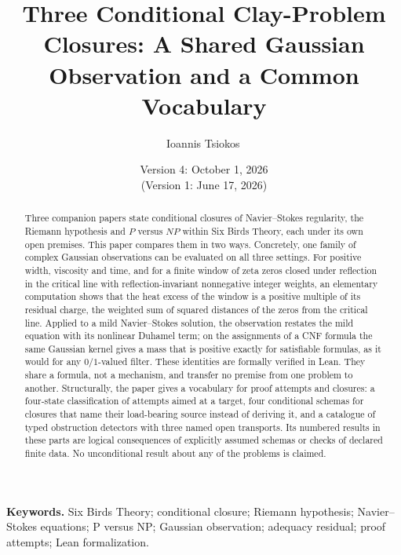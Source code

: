 \documentclass[11pt]{article}
\title{Three Conditional Clay-Problem Closures: A Shared Gaussian Observation and a Common Vocabulary}
\author{Ioannis Tsiokos\,\orcidlink{0009-0009-7659-5964}}
\date{Version 4: October 1, 2026\\[2pt] \footnotesize (Version 1: June 17, 2026)}
\theoremstyle{definition}
\begin{document}
\maketitle
\thispagestyle{firstpage}

\begin{abstract}
Three companion papers state conditional closures of Navier--Stokes
regularity, the Riemann hypothesis and \(P\) versus \(NP\) within Six
Birds Theory, each under its own open premises.  This paper compares
them in two ways.  Concretely, one family of complex Gaussian
observations can be evaluated on all three settings.  For positive
width, viscosity and time, and for a finite window of zeta zeros closed
under reflection in the critical line with reflection-invariant
nonnegative integer weights, an elementary computation shows that the heat excess of the
window is a positive multiple of its residual charge, the weighted sum
of squared distances of the zeros from the critical line.  Applied to a
mild Navier--Stokes solution, the observation restates the mild
equation with its nonlinear Duhamel term; on the assignments of a CNF
formula the same Gaussian kernel gives a mass that is positive exactly
for satisfiable formulas, as it would for any \(0/1\)-valued filter.  These identities are formally verified in
Lean.  They share a formula, not a mechanism, and transfer no premise
from one problem to another.  Structurally, the paper gives a
vocabulary for proof attempts and closures: a four-state classification
of attempts aimed at a target, four conditional schemas for closures
that name their load-bearing source instead of deriving it, and a
catalogue of typed obstruction detectors with three named open
transports.  Its numbered results in these parts are logical
consequences of explicitly assumed schemas or checks of declared finite
data.  No unconditional result about any of the problems is claimed.
\end{abstract}

\medskip
\noindent\textbf{Keywords.} Six Birds Theory; conditional closure;
Riemann hypothesis; Navier--Stokes equations; P versus NP; Gaussian
observation; adequacy residual; proof attempts; Lean formalization.













\appendix



\begingroup\raggedright


\endgroup
\end{document}
